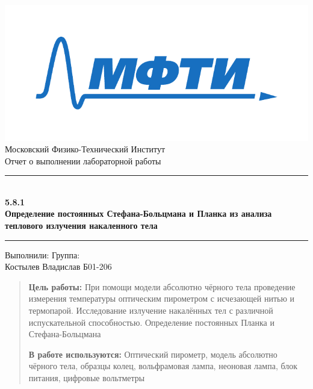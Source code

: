 \documentclass[a4paper, 12pt]{article}
\begin{document}

\begin{titlepage}
    \vspace*{\fill}
    
    \begin{center}
        \includegraphics[scale=0.8]{res/MIPT.pdf}
        \\[0.7cm]\Huge Московский Физико-Технический Институт
        \\[2cm]\LARGE Отчет о выполнении лабораторной работы 
        \\[0.5cm]\noindent\rule{\textwidth}{1pt}
        \\\Huge\textbf{5.8.1 \\ Определение постоянных Стефана-Больцмана и Планка из анализа теплового излучения накаленного тела}
        \\[-0.5cm]\noindent\rule{\textwidth}{1pt}
    \end{center}
    
    \vspace*{\fill}
    
    \begin{flushleft}
        Выполнили: \hspace{\fill} Группа:
        \\Костылев Владислав \hspace{\fill} Б01-206
    \end{flushleft}
\end{titlepage}

\setcounter{page}{2}


\begin{abstract}
    \textbf{Цель работы:} 
        При помощи модели абсолютно чёрного тела проведение измерения температуры оптическим пирометром с исчезающей нитью и термопарой.
        Исследование излучение накалённых тел с различной испускательной способностью.
        Определение постоянных Планка и Стефана-Больцмана
    
    \textbf{В работе используются:} 
        Оптический пирометр, модель абсолютно чёрного тела, образцы колец, вольфрамовая лампа, неоновая лампа, блок питания, цифровые вольтметры
\end{abstract}
\end{document}
